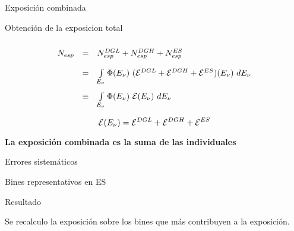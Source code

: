 \begin{frame}{Exposici\'on combinada}
	\begin{block}{Obtenci\'on de la exposicion total}
		\begin{center}
			\begin{displaymath}\renewcommand{\arraystretch}{2}
			\begin{array}{rcl}
			N_{esp}& =& N_{esp}^{DGL}+N_{esp}^{DGH}+N_{esp}^{ES} \\ 
			& = & \int\limits_{E_\nu}\Phi(E_\nu)~({\cal E}^{DGL}+{\cal E}^{DGH}+{\cal E}^{ES})(E_\nu)~dE_\nu\\
			& \equiv & \int\limits_{E_\nu}\Phi(E_\nu)~{\cal E}(E_\nu)~dE_\nu
			\end{array}
			\end{displaymath}
		\end{center}
	\end{block}
	
	\begin{alertblock}{}
	\centering
			\begin{displaymath}
			{\cal E}(E_\nu) = {\cal E}^{DGL}+{\cal E}^{DGH}+{\cal E}^{ES}
			\end{displaymath}
	\end{alertblock}
	
	\begin{exampleblock}{}
		\begin{center}
			\textbf{La exposici\'on combinada es la suma de las individuales}
		\end{center}
	\end{exampleblock}
\end{frame}

\begin{frame}{Errores sistem\'aticos}
	\begin{alertblock}{Bines representativos en ES}
		\begin{center}
		\end{center}
	\end{alertblock}
	\begin{block}{Resultado}
		\begin{center}
			Se recalculo la exposici\'on sobre los bines que m\'as contribuyen a la exposici\'on.
		\end{center}
	\end{block}
\end{frame}

